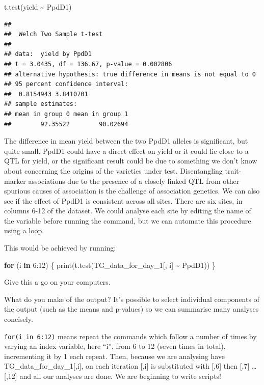 \documentclass[
]{book}
\newenvironment{Shaded}{\begin{snugshade}}{\end{snugshade}}
\newcommand{\ControlFlowTok}[1]{\textcolor[rgb]{0.13,0.29,0.53}{\textbf{#1}}}
\newcommand{\DecValTok}[1]{\textcolor[rgb]{0.00,0.00,0.81}{#1}}
\newcommand{\FunctionTok}[1]{\textcolor[rgb]{0.00,0.00,0.00}{#1}}
\newcommand{\NormalTok}[1]{#1}
\newcommand{\SpecialCharTok}[1]{\textcolor[rgb]{0.00,0.00,0.00}{#1}}
\begin{document}
\begin{Shaded}
\begin{Highlighting}[]
\FunctionTok{t.test}\NormalTok{(yield }\SpecialCharTok{\textasciitilde{}}\NormalTok{ PpdD1)}
\end{Highlighting}
\end{Shaded}

\begin{verbatim}
## 
##  Welch Two Sample t-test
## 
## data:  yield by PpdD1
## t = 3.0435, df = 136.67, p-value = 0.002806
## alternative hypothesis: true difference in means is not equal to 0
## 95 percent confidence interval:
##  0.8154943 3.8410701
## sample estimates:
## mean in group 0 mean in group 1 
##        92.35522        90.02694
\end{verbatim}

The difference in mean yield between the two PpdD1 alleles is significant, but quite small. PpdD1 could have a direct effect on yield or it could lie close to a QTL for yield, or the significant result could be due to something we don't know about concerning the origins of the varieties under test. Disentangling trait-marker associations due to the presence of a closely linked QTL from other spurious causes of association is the challenge of association genetics. We can also see if the effect of PpdD1 is consistent across all sites. There are six sites, in columns 6-12 of the dataset. We could analyse each site by editing the name of the variable before running the command, but we can automate this procedure using a loop.

This would be achieved by running:

\begin{Shaded}
\begin{Highlighting}[]
\ControlFlowTok{for}\NormalTok{ (i }\ControlFlowTok{in} \DecValTok{6}\SpecialCharTok{:}\DecValTok{12}\NormalTok{) \{}
    \FunctionTok{print}\NormalTok{(}\FunctionTok{t.test}\NormalTok{(TG\_data\_for\_day\_1[, i] }\SpecialCharTok{\textasciitilde{}}\NormalTok{ PpdD1))}
\NormalTok{\}}
\end{Highlighting}
\end{Shaded}

Give this a go on your computers.

What do you make of the output? It's possible to select individual components of the output (such as the means and p-values) so we can summarise many analyses concisely.

\texttt{for(i\ in\ 6:12)} means repeat the commands which follow a number of times by varying an index variable, here ``i'', from 6 to 12 (seven times in total), incrementing it by 1 each repeat. Then, because we are analysing have TG\_data\_for\_day\_1{[},i{]}, on each iteration {[},i{]} is substituted with {[},6{]} then {[},7{]} \ldots{} {[},12{]} and all our analyses are done. We are beginning to write scripts!
\end{document}
